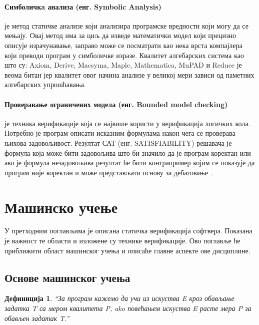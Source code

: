 \documentclass[a4paper]{article}
\newtheorem{definic}{Дефиниција}
\begin{document}
{\paragraph{Симболичкa анализа (енг. Symbolic Analysis)} је метод статичке анализе који анализира програмске вредности који могу да се мењају. Овај метод има за циљ да изведе математички модел који прецизно описује израчунавање, заправо може се посматрати као нека врста компајлера који преводи програм у симболичке изразе. Квалитет алгебарских система као што су: Axiom, Derive, Macsyma, Maple, Mathematica, MuPAD и Reduce је веома битан јер квалитет овог начина анализе у великој мери зависи од паметних алгебарских упрошћавања.


\paragraph{Проверавање ограничених модела (енг. Bounded model checking)} је техника верификације која се највише користи у верификација логичких кола. Потребно је програм описати исказним формулама након чега се проверава њихова задовољивост. Резултат САТ (енг. SATISFIABILITY) решавача је формула која може бити задовољива што би значило да је програм коректан или ако је формула незадовољива резултат ће бити контрапример којим се показује да програм није коректан и може представљати основу за дебаговање \cite{dkw2008, survey}.

\section{Машинско учење}
\label{sec:ml_intro}
У претходним поглављима је описана статичка верификација софтвера. Показана је важност те области и изложене су технике верификације. Ово поглавље ће приближити област машинског учења и описаће главне аспекте ове дисциплине.

\subsection{Основе машинског учења}
\begin{definic}
``За програм кажемо да учи из искуства E кроз обављање задатка T са мером квалитета P, ako повећањем искуства E расте мера P за обављен задатак T.''
\\[5pt]
\end{definic}


}
\end{document}
